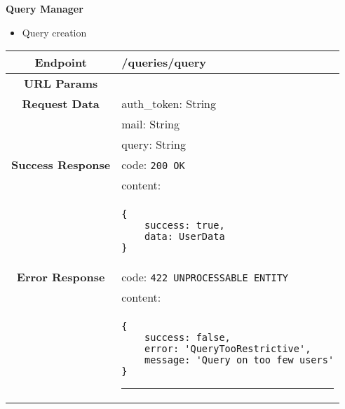    \textbf{Query Manager}
    \begin{itemize}
        \item Query creation
    \end{itemize}
    \begin{adjustwidth}{1cm}{}
        \begin{longtable}{|c|l|}
            \hline
            \textbf{Endpoint} & /queries/query \\
            \hline
            \textbf{URL Params} &  \\
            \hline
            \textbf{Request Data} & auth\_token: String \\
            &                 mail: String \\
            &                 query: String \\
            \hline
            \textbf{Success Response} & code: \texttt{200 OK} \\
            &                           content: \\
            & \begin{minipage}[t]{0.5\textwidth}
                \begin{adjustwidth}{1.5cm}{}
                \begin{verbatim}
{
    success: true, 
    data: UserData
}
                \end{verbatim}
                \end{adjustwidth}
              \end{minipage} \\
              \hline
            \textbf{Error Response} & code: \texttt{422 UNPROCESSABLE ENTITY} \\
            &                         content: \\
            & \begin{minipage}[t]{0.7\textwidth}
                \begin{adjustwidth}{1.5cm}{}
                \begin{verbatim}
{
    success: false, 
    error: 'QueryTooRestrictive',
    message: 'Query on too few users'
}
                \end{verbatim}
                \end{adjustwidth}
                \par\noindent\rule{\textwidth}{1pt}
                 \vspace{4pt}
              \end{minipage} \\

\end{longtable}
\end{adjustwidth}
